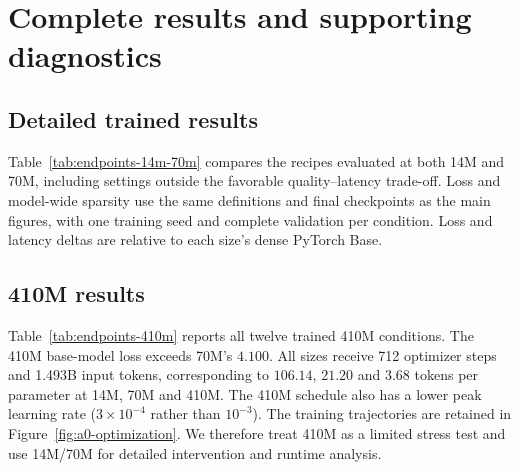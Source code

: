 \clearpage
\section{Complete results and supporting diagnostics}
\label{app:complete-results}

\subsection{Detailed trained results}
\label{app:endpoint-results}

Table~\ref{tab:endpoints-14m-70m} compares the recipes evaluated at both 14M
and 70M, including settings outside the favorable quality--latency trade-off.
Loss and model-wide sparsity use the same definitions and final checkpoints
as the main figures, with one training seed and complete validation per condition.
Loss and latency deltas are relative to each size's dense PyTorch Base.


\FloatBarrier

\subsection{410M results}
\label{app:410m-results}

Table~\ref{tab:endpoints-410m} reports all twelve trained 410M conditions. The 410M base-model loss exceeds 70M's $4.100$. All sizes receive 712 optimizer
steps and 1.493B input tokens, corresponding to $106.14$, $21.20$ and $3.68$
tokens per parameter at 14M, 70M and 410M. The 410M schedule also has a lower
peak learning rate ($3\times10^{-4}$ rather than $10^{-3}$). The training trajectories are retained in
Figure~\ref{fig:a0-optimization}. We therefore treat 410M as a limited
stress test and use 14M/70M for detailed intervention and runtime analysis.





